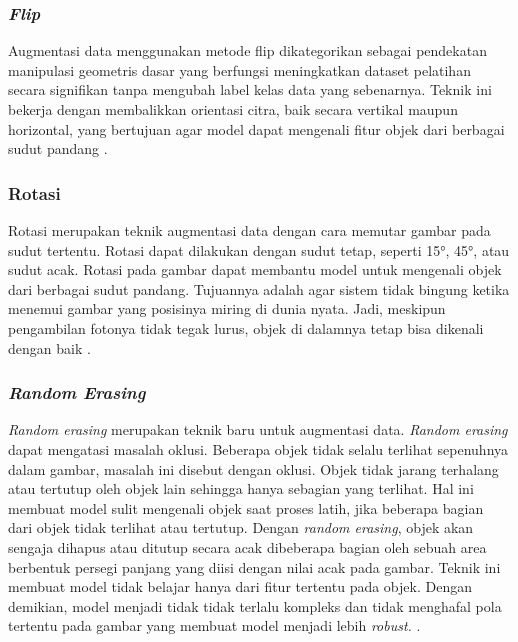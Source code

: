 \subsubsection{\textit{Flip}} \label{II.Teori3.1}
Augmentasi data menggunakan metode flip dikategorikan sebagai pendekatan 
manipulasi geometris dasar yang berfungsi meningkatkan dataset pelatihan 
secara signifikan tanpa mengubah label kelas data yang sebenarnya. Teknik ini 
bekerja dengan membalikkan orientasi citra, baik secara vertikal maupun 
horizontal, yang bertujuan agar model dapat mengenali fitur objek dari 
berbagai sudut pandang \cite{Goodfellow-et-al-2016}. \par

\subsubsection{Rotasi} \label{II.Teori3.2}
Rotasi merupakan teknik augmentasi data dengan cara memutar gambar pada 
sudut tertentu. Rotasi dapat dilakukan dengan sudut tetap, seperti 15°, 45°,  
atau sudut acak. Rotasi pada gambar dapat membantu model untuk mengenali 
objek dari berbagai sudut pandang. Tujuannya adalah agar sistem tidak bingung 
ketika menemui gambar yang posisinya miring di dunia nyata. Jadi, meskipun 
pengambilan fotonya tidak tegak lurus, objek di dalamnya tetap bisa dikenali 
dengan baik \cite{szeliski2022computer}. \par

\subsubsection{\textit{Random Erasing}} \label{II.Teori3.3}
\textit{Random erasing} merupakan teknik baru untuk augmentasi data. 
\textit{Random erasing} dapat mengatasi masalah oklusi. Beberapa objek tidak 
selalu terlihat sepenuhnya dalam gambar, masalah ini disebut dengan oklusi. 
Objek tidak jarang terhalang atau tertutup oleh objek lain sehingga hanya 
sebagian yang terlihat. Hal ini membuat model sulit mengenali objek saat 
proses latih, jika beberapa bagian dari objek tidak terlihat atau tertutup. 
Dengan \textit{random erasing}, objek akan sengaja dihapus atau ditutup 
secara acak dibeberapa bagian oleh sebuah area berbentuk persegi panjang yang 
diisi dengan nilai acak pada gambar. Teknik ini membuat model tidak belajar 
hanya dari fitur tertentu pada objek. Dengan demikian, model menjadi tidak 
tidak terlalu kompleks dan tidak menghafal pola tertentu pada gambar yang 
membuat model menjadi lebih \textit{robust.} \cite{Zhong_Zheng_Kang_Li_Yang_2020}. \par

